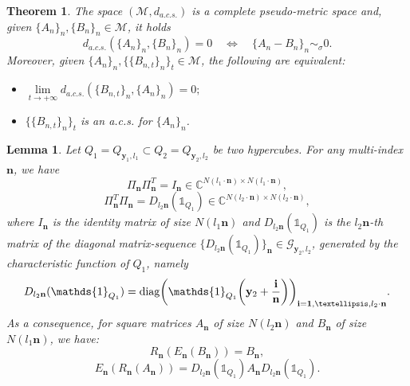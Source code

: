 \documentclass[10pt,a4paper]{amsart}
\newtheorem{thm}{Theorem}
\newtheorem{lem}{Lemma}
\newcommand{\diag}{\mathop{\mathrm{diag}}}\newcommand{\esssup}{\mathop{\mathrm{ess\,sup}}}\newcommand{\essinf}{\mathop{\mathrm{ess\,inf}}}\newcommand{\e}{\textup{e}}\renewcommand{\i}{\textup{i}}\newcommand{\bfa}{\mathbf a}\newcommand{\bfb}{\mathbf b}\newcommand{\bfc}{\mathbf c}\newcommand{\bfd}{\mathbf d}\newcommand{\bfe}{\mathbf e}\newcommand{\bff}{\mathbf f}\newcommand{\bfg}{\mathbf g}\newcommand{\bfh}{\mathbf h}\newcommand{\bfi}{\mathbf i}\newcommand{\bfj}{\mathbf j}\newcommand{\bfk}{\mathbf k}\newcommand{\bfl}{\mathbf l}\newcommand{\bfm}{\mathbf m}\newcommand{\bfn}{\mathbf n}\newcommand{\bfo}{\mathbf o}\newcommand{\bfp}{\mathbf p}\newcommand{\bfq}{\mathbf q}\newcommand{\bfr}{\mathbf r}\newcommand{\bfs}{\mathbf s}\newcommand{\bft}{\mathbf t}\newcommand{\bfu}{\mathbf u}\newcommand{\bfw}{\mathbf w}\newcommand{\bfv}{\mathbf v}\newcommand{\bfx}{\mathbf x}\newcommand{\bfy}{\mathbf y}\newcommand{\bfz}{\mathbf z}\newcommand{\bfzero}{\mathbf 0}\newcommand{\bfuno}{\mathbf 1}
\begin{document}
\begin{thm}\label{completeness_acs_conv}
    The space $(\mathcal{M},d_{a.c.s.})$ is a complete pseudo-metric space and, given $\{A_n\}_n,\{B_n\}_n\in\mathcal{M}$, it holds
    \begin{equation*}
        d_{a.c.s.}(\{A_n\}_n,\{B_n\}_n)=0\quad\iff\quad\{A_n-B_n\}_n\sim_{\sigma} 0.
    \end{equation*}
    Moreover, given $\{A_n\}_n,\{\{B_{n,t}\}_n\}_t\in\mathcal{M}$, the following are equivalent:
    \begin{itemize}
        \item $\lim\limits_{t\to+\infty} d_{a.c.s.}(\{B_{n,t}\}_n,\{A_n\}_n)=0;$
        \item $\{\{B_{n,t}\}_n\}_t$ is an a.c.s. for $\{A_n\}_n$.
    \end{itemize}
\end{thm}

\begin{lem}\label{lemma_1}
	 Let $Q_1=Q_{{\bfy_1},l_1}\subset Q_2=Q_{{\bfy_2},l_2}$ be two hypercubes. For any multi-index $\bfn$, we have 
	\begin{equation}\label{lemma_1_eq_1}
	 	\Pi_{\bfn}\Pi_{\bfn}^T = I_{\bfn}\in\mathbb{C}^{N(l_1\cdot \bfn)\times N(l_1\cdot\bfn)},
	\end{equation}
	\begin{equation}\label{lemma_1_eq_2}
		\Pi_{\bfn}^T \Pi_{\bfn} = D_{l_2\bfn}(\mathds{1}_{Q_1})\in\mathbb{C}^{N(l_2\cdot \bfn)\times N(l_2\cdot\bfn)},
	\end{equation}
	where $I_{\bfn}$ is the identity matrix of size $N(l_1\bfn)$ and $D_{l_2\bfn}(\mathds{1}_{Q_1})$ is the $l_2\bfn$-th matrix of the diagonal matrix-sequence $\{D_{l_2\bfn}(\mathds{1}_{Q_1})\}_\bfn\in\mathcal{G}_{{\bfy_2},l_2}$, generated by the characteristic function of $Q_1$, namely
	\begin{equation*}
		D_{l_2\bfn}(\mathds{1}_{Q_1})=\diag\biggl(\mathds{1}_{Q_1}\biggl(\bfy_2+\frac{\bfi}{\bfn}\biggr)\biggr)_{{\bfi}={\bf1},\ldots,l_2\cdot\bfn}.
	\end{equation*}
	As a consequence, for square matrices $A_{\bfn}$ of size $N(l_2\bfn)$ and $B_{\bfn}$ of size $N(l_1\bfn)$, we have:
	\begin{equation*}
		R_{\bfn}(E_{\bfn}(B_{\bfn}))=B_{\bfn},
	\end{equation*}
	\begin{equation*}
		E_{\bfn}(R_{\bfn}(A_{\bfn}))=D_{l_2\bfn}(\mathds{1}_{Q_1})A_{\bfn}D_{l_2\bfn}(\mathds{1}_{Q_1}).
	\end{equation*}

\end{lem}
\end{document}

